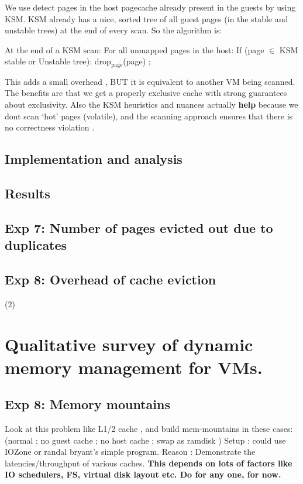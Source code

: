 \documentclass[11pt]{article}
\begin{document}
We use detect pages in the host pagecache already present in the guests by               using KSM. 
KSM already has a nice, sorted tree of all guest pages (in the stable and unstable trees) 
at the end of every scan. So the algorithm is: 

At the end of a  KSM scan: 
   For all unmapped pages in the host: 
       If (page $\in$ KSM stable or Unstable tree): 
          drop$_{\mathrm{page}}$(page) ; 
 

This adds a small overhead , BUT it is equivalent to another VM being scanned. 
The benefits are that we get a properly exclusive cache with strong guarantees 
about exclusivity. Also the KSM heuristics and nuances actually \textbf{help} because 
we dont scan `hot' pages (volatile), and the scanning approach ensures that 
there is no correctness violation .
\subsection{Implementation and analysis}
\label{sec-9_1}
\subsection{Results}
\label{sec-9_2}
\subsection{Exp 7: Number of pages evicted out due to duplicates}
\label{sec-9_3}
\subsection{Exp 8: Overhead of cache eviction}
\label{sec-9_4}

   (2)
\section{Qualitative survey of dynamic memory management for VMs.}
\label{sec-10}
\subsection{Exp 8: Memory mountains}
\label{sec-10_1}

Look at this problem like L1/2 cache , and build mem-mountains in these cases:
(normal ; no guest cache ; no host cache ; swap as ramdisk )
Setup : could use IOZone or randal bryant's simple program.
Reason : Demonstrate the latencies/throughput of various caches. 
\textbf{This depends on lots of factors like IO schedulers, FS, virtual disk layout etc. Do for any one, for now.}
\end{document}
